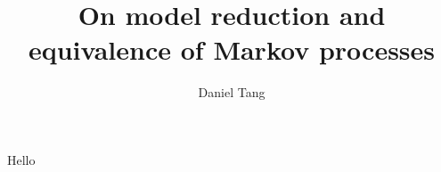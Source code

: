 \documentclass[a4paper]{article}
\title{On model reduction and equivalence of Markov processes}
\author{Daniel Tang}
\begin{document}
	\maketitle
	Hello
\end{document}
